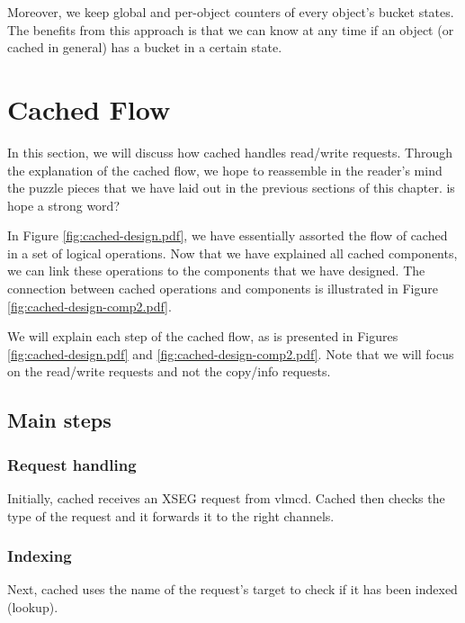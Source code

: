 Moreover, we keep global and per-object counters of every object's bucket 
states. The benefits from this approach is that we can know at any time if an 
object (or cached in general) has a bucket in a certain state.

\section{Cached Flow}\label{sec:cached-flow-design}

In this section, we will discuss how cached handles read/write requests.  
Through the explanation of the cached flow, we hope to reassemble in the 
reader's mind the puzzle pieces that we have laid out in the previous sections 
of this chapter.  \fixme is hope a strong word?

In Figure \ref{fig:cached-design.pdf}, we have essentially assorted the flow of 
cached in a set of logical operations. Now that we have explained all cached 
components, we can link these operations to the components that we have 
designed. The connection between cached operations and components is 
illustrated in Figure \ref{fig:cached-design-comp2.pdf}.


We will explain each step of the cached flow, as is presented in Figures 
\ref{fig:cached-design.pdf} and \ref{fig:cached-design-comp2.pdf}. Note that we
will focus on the read/write requests and not the copy/info requests.

\subsection{Main steps}

\subsubsection{Request handling}

Initially, cached receives an XSEG request from vlmcd. Cached then checks the 
type of the request and it forwards it to the right channels.

\subsubsection{Indexing}

Next, cached uses the name of the request's target to check if it has been 
indexed (lookup). 

